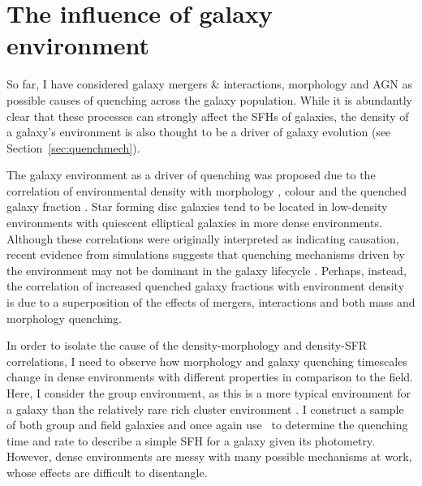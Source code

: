 \chapter{The influence of galaxy environment}\label{chap:env}
 
So far, I have considered  galaxy mergers \& interactions, morphology and AGN as possible causes of quenching across the galaxy population. While it is abundantly clear that these processes can strongly affect the SFHs of galaxies, the density of a galaxy's environment is also thought to be a driver of galaxy evolution (see Section~\ref{sec:quenchmech}).
 
The galaxy environment as a driver of quenching was proposed due to the correlation of environmental density with morphology \citep{dressler80, smail97, poggianti99, postman05, Bamford09}, colour \citep{butcher78, pimbblet02} and the quenched galaxy fraction \citep{kauffmann03, Baldry06, peng12, darvish16}. Star forming disc galaxies tend to be located in low-density environments with quiescent elliptical galaxies in more dense environments. Although these correlations were originally interpreted as indicating causation, recent evidence from simulations suggests that quenching mechanisms driven by the environment may not be dominant in the galaxy lifecycle \citep{kimm09, kimm11, hirschmann14, wang14, phillips15}. Perhaps, instead, the correlation of increased quenched galaxy fractions with environment density is due to a superposition of the effects of mergers, interactions and both mass and morphology quenching. 
  
In order to isolate the cause of the density-morphology and density-SFR correlations, I need to observe how morphology and galaxy quenching timescales change in dense environments with different properties in comparison to the field. Here, I consider the group environment, as this is a more typical environment for a galaxy than the relatively rare rich cluster environment \citep{carlberg04}. I construct a sample of both group and field galaxies and once again use \starpy\ to determine the quenching time and rate to describe a simple SFH for a galaxy given its photometry. However, dense environments are messy with many possible mechanisms at work, whose effects are difficult to disentangle. %

